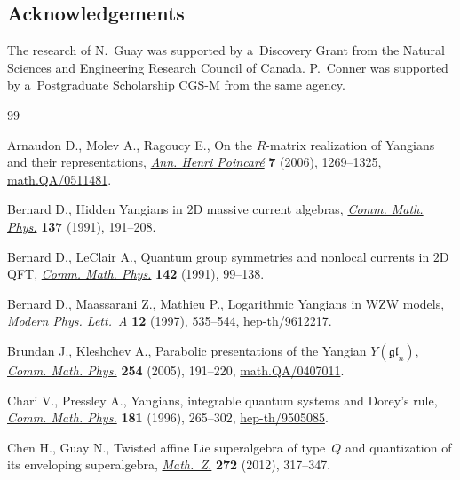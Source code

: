 \documentclass[pdftex]{sigma}
\numberwithin{theorem}{section}
\numberwithin{proposition}{section}
\numberwithin{lemma}{section}
\numberwithin{corollary}{section}
\numberwithin{definition}{section}
\numberwithin{example}{section}
\numberwithin{remark}{section}
\numberwithin{note}{section}
\numberwithin{equation}{section}
\begin{document}
\subsection*{Acknowledgements}

The research of N.~Guay was supported by a~Discovery Grant from the Natural Sciences and Engineering Research Council of
Canada.
P.~Conner was supported by a~Postgraduate Scholarship CGS-M from the same agency.

\begin{thebibliography}{99}
\footnotesize \itemsep=0pt

Arnaudon D., Molev A., Ragoucy E., On the {$R$}-matrix realization of
  {Y}angians and their representations, \href{http://dx.doi.org/10.1007/s00023-006-0281-9}{\textit{Ann. Henri Poincar\'e}}
  \textbf{7} (2006), 1269--1325, \href{http://arxiv.org/abs/math.QA/0511481}{math.QA/0511481}.

Bernard D., Hidden {Y}angians in {$2$}{D} massive current algebras,
  \href{http://dx.doi.org/10.1007/BF02099123}{\textit{Comm. Math. Phys.}} \textbf{137} (1991), 191--208.

Bernard D., LeClair A., Quantum group symmetries and nonlocal currents in
  {$2$}{D} {QFT}, \href{http://dx.doi.org/10.1007/BF02099173}{\textit{Comm. Math. Phys.}} \textbf{142} (1991), 99--138.

Bernard D., Maassarani Z., Mathieu P., Logarithmic {Y}angians in {WZW} models,
  \href{http://dx.doi.org/10.1142/S0217732397000558}{\textit{Modern Phys. Lett.~A}} \textbf{12} (1997), 535--544,
  \href{http://arxiv.org/abs/hep-th/9612217}{hep-th/9612217}.

Brundan J., Kleshchev A., Parabolic presentations of the {Y}angian
  {$Y({\mathfrak{gl}}_n)$}, \href{http://dx.doi.org/10.1007/s00220-004-1249-6}{\textit{Comm. Math. Phys.}} \textbf{254} (2005),
  191--220, \href{http://arxiv.org/abs/math.QA/0407011}{math.QA/0407011}.

Chari V., Pressley A., Yangians, integrable quantum systems and {D}orey's rule,
  \href{http://dx.doi.org/10.1007/BF02101006}{\textit{Comm. Math. Phys.}} \textbf{181} (1996), 265--302,
  \href{http://arxiv.org/abs/hep-th/9505085}{hep-th/9505085}.

Chen H., Guay N., Twisted af\/f\/ine {L}ie superalgebra of type~{$Q$} and
  quantization of its enveloping superalgebra, \href{http://dx.doi.org/10.1007/s00209-011-0935-2}{\textit{Math.~Z.}} \textbf{272}
  (2012), 317--347.


\end{thebibliography}
\end{document}
